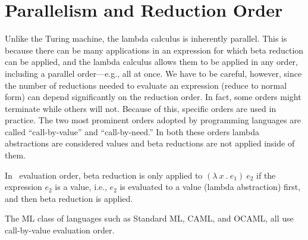 \section{Parallelism and Reduction Order}
\label{sec:lc::call-by-value-and-need}

\begin{cluster}
\label{grp:grm:lambda-calculus::unlike}

\begin{gram}
\label{grm:lambda-calculus::unlike}
Unlike the Turing machine, the lambda calculus is inherently parallel.
This is because there can be many applications in an expression
for which beta reduction can be applied,
and the lambda calculus allows them to be applied in any order,
including a parallel order---e.g., all at once.
We have to be careful, however, since the number of reductions needed
to evaluate an expression (reduce to normal form) can depend
significantly on the reduction order.  In fact, some orders might
terminate while others will not.
Because of this, specific orders are used in practice.
The two most prominent orders adopted by programming
languages are called ``call-by-value'' and
``call-by-need.''    
In both these orders lambda abstractions are considered values and 
beta reductions are not applied inside of them. 

\end{gram}
\end{cluster}

\begin{flex}
\label{grp:def:lambda-calculus::call-by-value}

\begin{definition}
\label{def:lambda-calculus::call-by-value}
In~ evaluation order, beta reduction is only applied to
$(\lambda~x~.~e_1)~e_2$ if the expression $e_2$
is a value, i.e., $e_2$ is evaluated to a value (lambda abstraction)
first, and then
beta reduction is applied.

\end{definition}

\begin{example}
\label{xmpl:lambda-calculus::class}
The ML class of languages such as Standard ML, CAML, and OCAML, all
use call-by-value evaluation order.

\end{example}
\end{flex}

